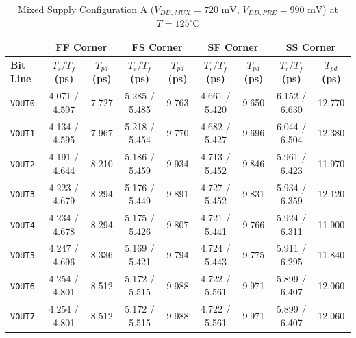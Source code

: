 \begin{table}[H]
    \centering
    \renewcommand{\arraystretch}{1.3}
    \setlength{\tabcolsep}{4pt}
    \small
    \begin{tabular}{|l|cc|cc|cc|cc|}
        \hline
        & \multicolumn{2}{c|}{\textbf{FF Corner}} & \multicolumn{2}{c|}{\textbf{FS Corner}} & \multicolumn{2}{c|}{\textbf{SF Corner}} & \multicolumn{2}{c|}{\textbf{SS Corner}} \\ \hline
        \textbf{Bit Line} & \textbf{$T_r / T_f$ (ps)} & \textbf{$T_{pd}$ (ps)} & \textbf{$T_r / T_f$ (ps)} & \textbf{$T_{pd}$ (ps)} & \textbf{$T_r / T_f$ (ps)} & \textbf{$T_{pd}$ (ps)} & \textbf{$T_r / T_f$ (ps)} & \textbf{$T_{pd}$ (ps)} \\ \hline
        \texttt{VOUT0} & 4.071 / 4.507 & 7.727 & 5.285 / 5.485 & 9.763 & 4.661 / 5.420 & 9.650 & 6.152 / 6.630 & 12.770 \\ 
        \texttt{VOUT1} & 4.134 / 4.595 & 7.967 & 5.218 / 5.454 & 9.770 & 4.682 / 5.427 & 9.696 & 6.044 / 6.504 & 12.380 \\ 
        \texttt{VOUT2} & 4.191 / 4.644 & 8.210 & 5.186 / 5.459 & 9.934 & 4.713 / 5.452 & 9.846 & 5.961 / 6.423 & 11.970 \\ 
        \texttt{VOUT3} & 4.223 / 4.679 & 8.294 & 5.176 / 5.449 & 9.891 & 4.727 / 5.452 & 9.831 & 5.934 / 6.359 & 12.120 \\ 
        \texttt{VOUT4} & 4.234 / 4.678 & 8.294 & 5.175 / 5.426 & 9.807 & 4.721 / 5.441 & 9.766 & 5.924 / 6.311 & 11.900 \\ 
        \texttt{VOUT5} & 4.247 / 4.696 & 8.336 & 5.169 / 5.421 & 9.794 & 4.724 / 5.443 & 9.775 & 5.911 / 6.295 & 11.840 \\ 
        \texttt{VOUT6} & 4.254 / 4.801 & 8.512 & 5.172 / 5.515 & 9.988 & 4.722 / 5.561 & 9.971 & 5.899 / 6.407 & 12.060 \\ 
        \texttt{VOUT7} & 4.254 / 4.801 & 8.512 & 5.172 / 5.515 & 9.988 & 4.722 / 5.561 & 9.971 & 5.899 / 6.407 & 12.060 \\ \hline
    \end{tabular}
    \vspace{2mm}
    \caption{Mixed Supply Configuration A ($V_{DD,MUX} = 720\text{ mV}$, $V_{DD,PRE} = 990\text{ mV}$) at $T = 125^{\circ}\text{C}$}
    \label{tab:asym_a_125}
\end{table}

